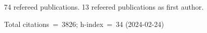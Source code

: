 74 refereed publications. 13 refeered publications as first author.

Total citations~=~3826; h-index~=~34 (2024-02-24)
